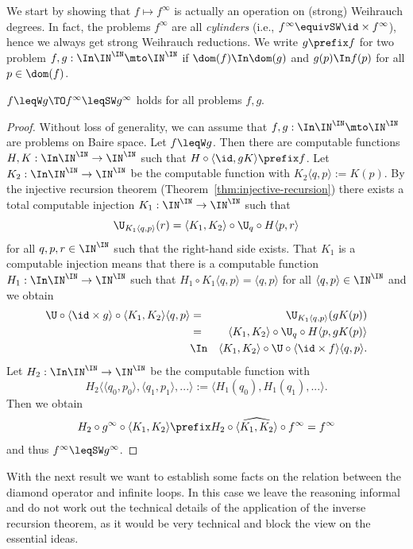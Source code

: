 We start by showing that $f\mapsto f^\infty$ is actually an operation on (strong) Weihrauch degrees.
In fact, the problems $f^\infty$ are all {\em cylinders} (i.e., $f^\infty\equivSW\id\times f^\infty$), 
hence we always get strong Weihrauch reductions. We write $g\prefix f$ for two problem $f,g:\In\IN^\IN\mto\IN^\IN$
if $\dom(f)\In\dom(g)$ and $g(p)\In f(p)$ for all $p\in\dom(f)$.

\begin{prop}
\label{prop:monotonicity}
$f\leqW g\TO f^\infty\leqSW g^\infty$ holds for all problems $f,g$.
\end{prop}
\begin{proof}
Without loss of generality, we can assume that $f,g:\In\IN^\IN\mto\IN^\IN$ are problems on Baire space.
Let $f\leqW g$. Then there are computable functions $H,K:\In\IN^\IN\to\IN^\IN$ such that
$H\circ\langle\id, gK\rangle\prefix f$. 
Let $K_2:\In\IN^\IN\to\IN^\IN$ be the computable function
with $K_2\langle q,p\rangle:=K(p)$. 
By the injective recursion theorem (Theorem~\ref{thm:injective-recursion}) 
there exists a total computable injection $K_1:\IN^\IN\to\IN^\IN$ such that
\[\U_{K_1\langle q,p\rangle}(r)=\langle K_1, K_2\rangle\circ\U_q \circ H\langle p,r\rangle\]
for all $q,p,r\in\IN^\IN$ such that the right-hand side exists.
That $K_1$ is a computable injection means that there is a computable function $H_1:\In\IN^\IN\to\IN^\IN$ such that $H_1\circ K_1\langle q,p\rangle=\langle q,p\rangle$
for all $\langle q,p\rangle\in\IN^\IN$ and we obtain
\begin{eqnarray*}
\U\circ\langle\id\times g\rangle\circ \langle K_1, K_2\rangle\langle q,p\rangle
&=&\U_{K_1\langle q,p\rangle}(gK(p))\\
&=&\langle K_1,K_2\rangle\circ\U_q\circ H\langle p,gK(p)\rangle\\
&\In&\langle K_1, K_2\rangle\circ \U\circ\langle\id\times f\rangle\langle q,p\rangle.
\end{eqnarray*}
Let $H_2:\In\IN^\IN\to\IN^\IN$ be the computable function with 
\[H_2\langle\langle q_0,p_0\rangle,\langle q_1,p_1\rangle,...\rangle:=\langle H_1(q_0),H_1(q_1),...\rangle.\]
Then we obtain 
\[H_2\circ g^\infty\circ\langle K_1,K_2\rangle\prefix H_2\circ\widehat{\langle K_1,K_2\rangle}\circ f^\infty=f^\infty\]
and thus $f^\infty\leqSW g^\infty$.
\end{proof}

\noindent
With the next result we want to establish some facts on the relation between the diamond operator
and infinite loops. In this case we leave the reasoning informal and do not work out the 
technical details of the application of the inverse recursion theorem, as it would be very
technical and block the view on the essential ideas.

